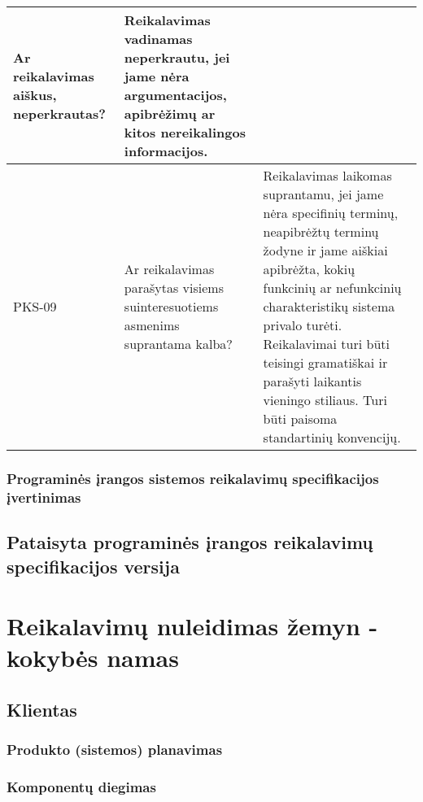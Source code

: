 \documentclass{VUMIFPSkursinis}
\begin{document}
\begin{center}
\begin{longtable}{|C{2cm}|L{5cm}|L{8cm}|}
		Ar reikalavimas aiškus, neperkrautas?                                           &
		Reikalavimas vadinamas neperkrautu, jei jame nėra argumentacijos, apibrėžimų ar kitos nereikalingos informacijos.                                                                                                                                                                                                                                                                                                                             \\ \hline
		PKS-09                                                                          &
		Ar reikalavimas parašytas visiems suinteresuotiems asmenims suprantama kalba?   &
		Reikalavimas laikomas suprantamu, jei jame nėra specifinių terminų, neapibrėžtų terminų žodyne ir jame aiškiai apibrėžta, kokių funkcinių ar nefunkcinių charakteristikų sistema privalo turėti. Reikalavimai turi būti teisingi gramatiškai ir parašyti laikantis vieningo stiliaus. Turi būti paisoma standartinių konvencijų.                                                                                                              \\ \hline
	\end{longtable}
\end{center}

\subsubsection{Programinės įrangos sistemos reikalavimų specifikacijos įvertinimas}

\subsection{Pataisyta programinės įrangos reikalavimų specifikacijos versija}

\section{Reikalavimų nuleidimas žemyn - kokybės namas}
\subsection{Klientas}
\subsubsection{Produkto (sistemos) planavimas}
\subsubsection{Komponentų diegimas}
\end{document}
